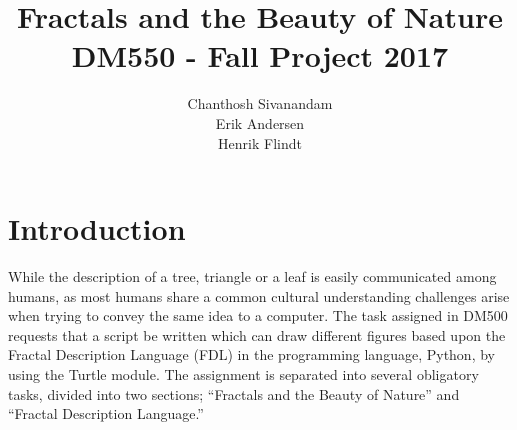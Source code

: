 \documentclass[titlepage]{article}
\author{Chanthosh Sivanandam \\ Erik Andersen \\ Henrik Flindt }
\title{Fractals and the Beauty of Nature \\ DM550 - Fall Project 2017}
\begin{document}
\maketitle
\section{Introduction}
While the description of a tree, triangle or a leaf is easily communicated among humans, as most humans share a common cultural understanding challenges arise when trying to convey the same idea to a computer. The task assigned in DM500 requests that a script be written which can draw different figures based upon the Fractal Description Language (FDL) in the programming language, Python, by using the Turtle module. The assignment is separated into several obligatory tasks, divided into two sections; “Fractals and the Beauty of Nature” and “Fractal Description Language.”
\end{document}
